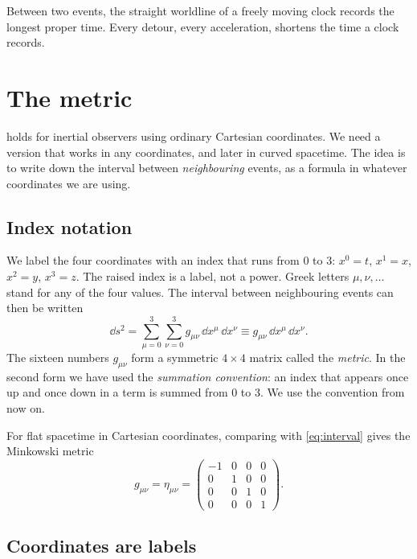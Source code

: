 \begin{keyidea}
Between two events, the straight worldline of a freely moving clock records
the longest proper time. Every detour, every acceleration, shortens the time a
clock records.
\end{keyidea}

\section{The metric}\label{sec:metric}

 holds for inertial observers using ordinary Cartesian
coordinates. We need a version that works in any coordinates, and later in
curved spacetime. The idea is to write down the interval between
\emph{neighbouring} events, as a formula in whatever coordinates we are using.

\subsection{Index notation}

We label the four coordinates with an index that runs from 0 to 3:
$x^{0} = t$, $x^{1} = x$, $x^{2} = y$, $x^{3} = z$. The raised index is a label,
not a power. Greek letters $\mu, \nu, \dots$ stand for any of the four values.
The interval between neighbouring events can then be written
\begin{equation}
  \dd s^{2} = \sum_{\mu=0}^{3}\sum_{\nu=0}^{3} g_{\mu\nu}\,\dd x^{\mu}\,\dd x^{\nu}
  \equiv g_{\mu\nu}\,\dd x^{\mu}\,\dd x^{\nu}.
  \label{eq:metric}
\end{equation}
The sixteen numbers $g_{\mu\nu}$ form a symmetric $4\times4$ matrix called the
\emph{metric}. In the second form we have used the \emph{summation convention}:
an index that appears once up and once down in a term is summed from 0 to 3.
We use the convention from now on.

For flat spacetime in Cartesian coordinates, comparing with
\cref{eq:interval} gives the Minkowski metric
\begin{equation}
  g_{\mu\nu} = \eta_{\mu\nu} =
  \begin{pmatrix} -1 & 0 & 0 & 0\\ 0 & 1 & 0 & 0\\ 0 & 0 & 1 & 0\\ 0 & 0 & 0 & 1\end{pmatrix}.
\end{equation}

\subsection{Coordinates are labels}

